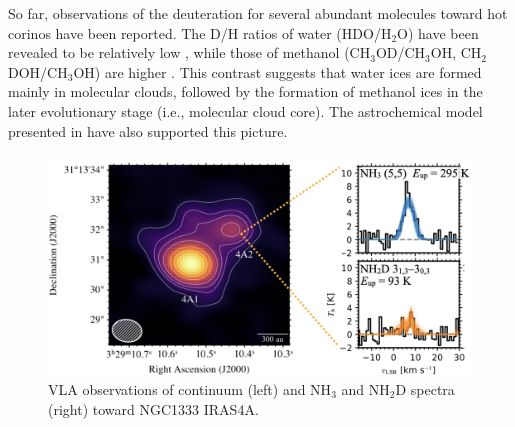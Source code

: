 \documentclass[12pt,a4paper]{article}  %
\begin{document}
So far, observations of the deuteration for several abundant molecules toward hot corinos have been reported. The D/H ratios of water (HDO/H$_2$O) have been revealed to be relatively low \citep[$\sim$10$^{-3}$--10$^{-4}$; e.g.,][]{Jorgensen10}, while those of methanol (CH$_3$OD/CH$_3$OH, CH$_2$DOH/CH$_3$OH) are higher \citep[$\sim$10$^{-2}$; e.g.,][]{Bianchi17}. This contrast suggests that water ices are formed mainly in molecular clouds, followed by the formation of methanol ices in the later evolutionary stage (i.e., molecular cloud core). The astrochemical model presented in \citet{Furuya18} have also supported this picture. 

\begin{figure}
\centering
\vspace{-1em}
\includegraphics[keepaspectratio, width=0.95\hsize]{IRAS4A_ammonia.png}
\caption{VLA observations of continuum (left) and NH$_3$ and NH$_2$D spectra (right) toward NGC1333 IRAS4A.}
\label{fig:IRAS4A_VLA}
\end{figure}
\end{document}
